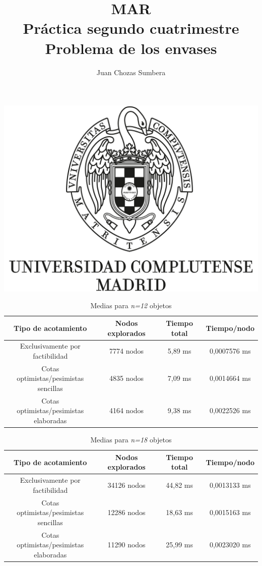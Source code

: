 \documentclass[12pt , a4paper]{article}
\title{MAR\\Práctica segundo cuatrimestre\\Problema de los envases}
\author{Juan Chozas Sumbera}
\begin{document}
	
\maketitle
\begin{center}
	\includegraphics[width=\textwidth]{logo_UCM.jpg}
\end{center}

\newpage

\begin{table}[h!]
	\begin{tabular}{||c || c c c||} 
		\hline
		Tipo de acotamiento 									& Nodos explorados		& Tiempo total 		& Tiempo/nodo 	\\ [0.5ex] 
		\hline\hline
		Exclusivamente por factibilidad 						& 7774 nodos			& 5,89 ms 			& 0,0007576 ms 
		\\ \hline
		\makecell{Cotas optimistas/pesimistas \\ sencillas}		& 4835 nodos			& 7,09 ms			& 0,0014664 ms 	
		\\ 	\hline
		\makecell{Cotas optimistas/pesimistas \\ elaboradas} 	& 4164 nodos			& 9,38 ms 			& 0,0022526 ms 
		\\ 	\hline
	\end{tabular}
	\caption{Medias para \textit{n=12} objetos}
	\label{table:1}
\end{table}

\begin{table}[h!]
	\centering
	\begin{tabular}{||c || c c c||} 
		\hline
		Tipo de acotamiento 									& Nodos explorados		& Tiempo total 		& Tiempo/nodo 	\\ [0.5ex] 
		\hline\hline
		Exclusivamente por factibilidad 						& 34126 nodos			& 44,82 ms 			& 0,0013133 ms
		\\ \hline
		\makecell{Cotas optimistas/pesimistas \\ sencillas}		& 12286 nodos			& 18,63 ms			& 0,0015163 ms 	
		\\ 	\hline
		\makecell{Cotas optimistas/pesimistas \\ elaboradas} 	& 11290	nodos			& 25,99 ms			& 0,0023020 ms 
		\\ 	\hline
	\end{tabular}
	\caption{Medias para \textit{n=18} objetos}
	\label{table:1}
\end{table}
\end{document}
